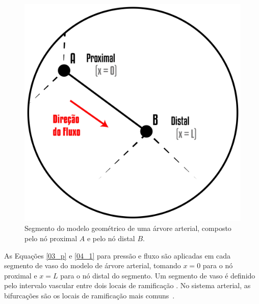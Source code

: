 
\begin{figure}[!htbp]
	\centering
	\includegraphics[scale=1]{Figures/ProximalDistal@16x.png}
	\caption{Segmento do modelo geométrico de uma árvore arterial, composto pelo nó proximal $A$ e pelo nó distal $B$.}
	\label{fig:proximaldistal}
\end{figure}

As Equações \eqref{03_p} e \eqref{04_1} para pressão e fluxo são aplicadas em cada segmento de vaso do modelo de árvore arterial, tomando $x = 0$ para o nó proximal e $x = L$ para o nó distal do segmento. Um segmento de vaso é definido pelo intervalo vascular entre dois locais de ramificação \cite{Zamir3}. No sistema arterial, as bifurcações são os locais de ramificação mais comuns~\cite{Zamir1}.

